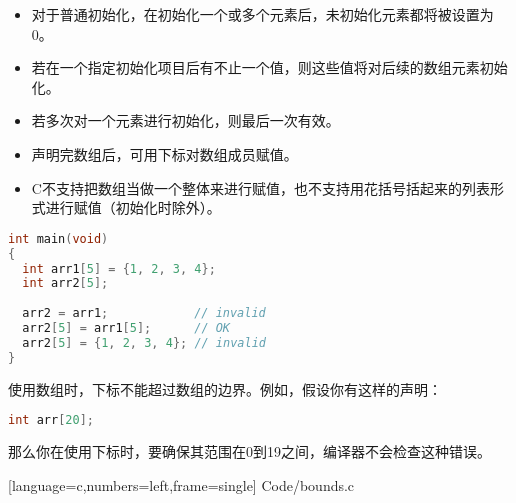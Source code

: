 \begin{frame}[fragile]
\begin{itemize}
\item 
对于普通初始化，在初始化一个或多个元素后，未初始化元素都将被设置为0。\\[0.1in]
\item 
若在一个指定初始化项目后有不止一个值，则这些值将对后续的数组元素初始化。\\[0.1in]
\item
若多次对一个元素进行初始化，则最后一次有效。
\end{itemize}

\end{frame}

\begin{frame}[fragile]
\begin{itemize}
\item 
声明完数组后，可用下标对数组成员赋值。\\[0.1in]
\item
C不支持把数组当做一个整体来进行赋值，也不支持用花括号括起来的列表形式进行赋值（初始化时除外）。
\end{itemize}
\end{frame}

\begin{frame}[fragile]
\begin{lstlisting}[language=c,backgroundcolor=\color{red!20}]
int main(void)
{
  int arr1[5] = {1, 2, 3, 4};
  int arr2[5];
  
  arr2 = arr1;            // invalid
  arr2[5] = arr1[5];      // OK
  arr2[5] = {1, 2, 3, 4}; // invalid
}
\end{lstlisting}
\end{frame}

\begin{frame}[fragile]
使用数组时，下标不能超过数组的边界。例如，假设你有这样的声明：
\begin{lstlisting}[language=c,backgroundcolor=\color{red!20}]
int arr[20];
\end{lstlisting}
那么你在使用下标时，要确保其范围在0到19之间，编译器不会检查这种错误。
\end{frame}

\begin{frame}

[language=c,numbers=left,frame=single]
{Code/bounds.c}
\end{frame}

